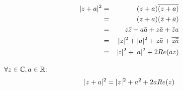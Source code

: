 \documentclass[letterpaper,12pt,fleqn]{article}
\newcommand{\conj}[1]{\bar{#1}}
\newcommand{\Conj}[1]{\overline{#1}}
\begin{document}
\begin{theproof}
\listbreak
\begin{eqnarray*}
\abs{z+a}^2 &=& (z+a)\Conj{(z+a)} \\
    &=& (z+a)(\conj{z}+\conj{a}) \\
    &=& z\conj{z}+a\conj{a}+z\conj{a}+\conj{z}a \\
    &=& \abs{z}^2+\abs{a}^2+z\conj{a}+\Conj{z\conj{a}} \\
    &=& \abs{z}^2+\abs{a}^2+2Re(\conj{a}z) \\
\end{eqnarray*}
\end{theproof}

\begin{corollary}
$\forall z\in\mathbb{C}, a\in\mathbb{R}$:
\[\lvert z+a\rvert^2=\lvert z\rvert^2+a^2+2aRe(z)\]
\end{corollary}
\end{document}
